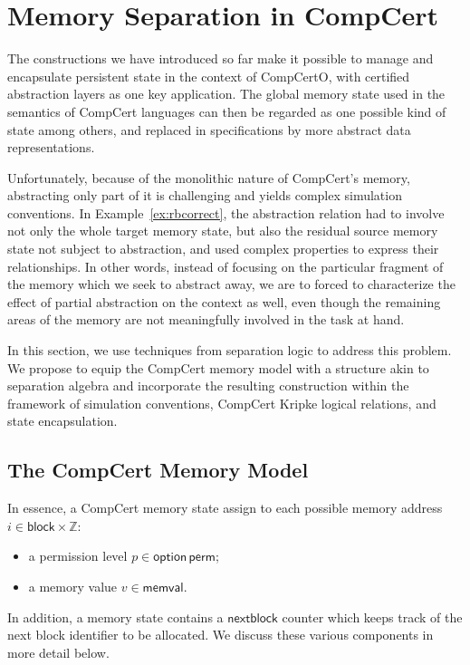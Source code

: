 \documentclass[acmsmall,screen,review,anonymous]{acmart}
\newcommand{\kw}[1]{\ensuremath{ \mathsf{#1} }}
\begin{document}


\section{Memory Separation in CompCert} \label{sec:sep} %

The constructions we have introduced so far
make it possible to manage and encapsulate persistent state
in the context of CompCertO,
with certified abstraction layers
as one key application.
The global memory state used in the semantics of CompCert languages
can then be regarded as one possible kind of state among others,
and replaced in specifications by more abstract data representations.

Unfortunately,
because of the monolithic nature of CompCert's memory,
abstracting only part of it is challenging
and yields complex simulation conventions.
In Example~\ref{ex:rbcorrect},
the abstraction relation had to involve
not only the whole target memory state,
but also the residual source memory state
not subject to abstraction,
and used complex properties to express their relationships.
In other words,
instead of focusing on the particular fragment of the memory
which we seek to abstract away,
we are to forced to characterize the effect of partial abstraction
on the context as well,
even though the remaining areas of the memory
are not meaningfully involved in the task at hand.

In this section,
we use techniques from separation logic
to address this problem.
We propose to equip the CompCert memory model
with a structure akin to separation algebra \cite{something-for-sa}
and incorporate the resulting construction
within the framework of simulation conventions,
CompCert Kripke logical relations,
and state encapsulation.

\subsection{The CompCert Memory Model}

In essence,
a CompCert memory state
assign to each possible memory address $i \in \kw{block} \times \mathbb{Z}$:
\begin{itemize}
  \item a permission level $p \in \kw{option}\,\kw{perm}$;
  \item a memory value $v \in \kw{memval}$.
\end{itemize}
In addition,
a memory state contains a $\kw{nextblock}$ counter
which keeps track of the next block identifier to be allocated.
We discuss these various components in more detail below.
\end{document}
